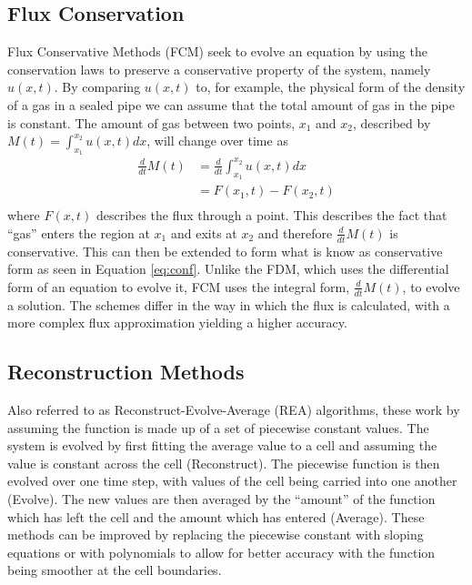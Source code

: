 \subsection{Flux Conservation}
Flux Conservative Methods (FCM) seek to evolve an equation by using the conservation laws to preserve a conservative property of the system, namely $u(x,t)$. By comparing $u(x,t)$ to, for example, the physical form of the density of a gas in a sealed pipe we can assume that the total amount of gas in the pipe is constant. The amount of gas between two points, $x_1$ and $x_2$, described by $M(t)=\int_{x_1}^{x_2}u(x,t)dx$, will change over time as
\begin{align*}
  \frac{d}{dt}M(t)	&= \frac{d}{dt}\int_{x_1}^{x_2}u(x,t)dx  	\\
		        &= F(x_1,t) - F(x_2,t)				\\
\end{align*}
where $F(x,t)$ describes the flux through a point. This describes the fact that ``gas'' enters the region at $x_1$ and exits at $x_2$ and therefore $\frac{d}{dt}M(t)$ is conservative. This can then be extended to form what is know as conservative form as seen in Equation \ref{eq:conf}. Unlike the FDM, which uses the differential form of an equation to evolve it, FCM uses the integral form, $\frac{d}{dt}M(t)$, to evolve a solution. The schemes differ in the way in which the flux is calculated, with a more complex flux approximation yielding a higher accuracy.
\subsection{Reconstruction Methods}\label{sec:recon}
Also referred to as Reconstruct-Evolve-Average (REA) algorithms, these work by assuming the function is made up of a set of piecewise constant values. The system is evolved by first fitting the average value to a cell and assuming the value is constant across the cell (Reconstruct). The piecewise function is then evolved over one time step, with values of the cell being carried into one another (Evolve). The new values are then averaged by the ``amount'' of the function which has left the cell and the amount which has entered (Average). These methods can be improved by replacing the piecewise constant with sloping equations or with polynomials to allow for better accuracy with the function being smoother at the cell boundaries.

